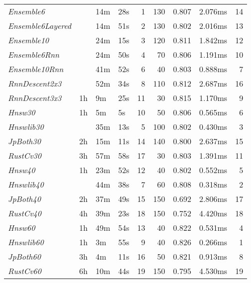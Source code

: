 \begin{tabular}{llllrrrlr}
\toprule
\midrule
\emph{Ensemble6} &  & 14m & 28s & 1 & 130 & 0.807 & 2.076ms & 14 \\
\emph{Ensemble6Layered} &  & 14m & 51s & 2 & 130 & 0.802 & 2.016ms & 13 \\
\emph{Ensemble10} &  & 24m & 15s & 3 & 120 & 0.811 & 1.842ms & 12 \\
\emph{Ensemble6Rnn} &  & 24m & 50s & 4 & 70 & 0.806 & 1.191ms & 10 \\
\emph{Ensemble10Rnn} &  & 41m & 52s & 6 & 40 & 0.803 & 0.888ms & 7 \\
\emph{RnnDescent2x3} &  & 52m & 34s & 8 & 110 & 0.812 & 2.687ms & 16 \\
\emph{RnnDescent3x3} & 1h & 9m & 25s & 11 & 30 & 0.815 & 1.170ms & 9 \\
\emph{Hnsw30} & 1h & 5m & 5s & 10 & 50 & 0.806 & 0.565ms & 6 \\
\emph{Hnswlib30} &  & 35m & 13s & 5 & 100 & 0.802 & 0.430ms & 3 \\
\emph{JpBoth30} & 2h & 15m & 11s & 14 & 140 & 0.800 & 2.637ms & 15 \\
\emph{RustCv30} & 3h & 57m & 58s & 17 & 30 & 0.803 & 1.391ms & 11 \\
\emph{Hnsw40} & 1h & 23m & 52s & 12 & 40 & 0.802 & 0.552ms & 5 \\
\emph{Hnswlib40} &  & 44m & 38s & 7 & 60 & 0.808 & 0.318ms & 2 \\
\emph{JpBoth40} & 2h & 37m & 49s & 15 & 150 & 0.692 & 2.806ms & 17 \\
\emph{RustCv40} & 4h & 39m & 23s & 18 & 150 & 0.752 & 4.420ms & 18 \\
\emph{Hnsw60} & 1h & 49m & 54s & 13 & 40 & 0.822 & 0.531ms & 4 \\
\emph{Hnswlib60} & 1h & 3m & 55s & 9 & 40 & 0.826 & 0.266ms & 1 \\
\emph{JpBoth60} & 3h & 4m & 11s & 16 & 50 & 0.821 & 0.913ms & 8 \\
\emph{RustCv60} & 6h & 10m & 44s & 19 & 150 & 0.795 & 4.530ms & 19 \\
\bottomrule
\end{tabular}
